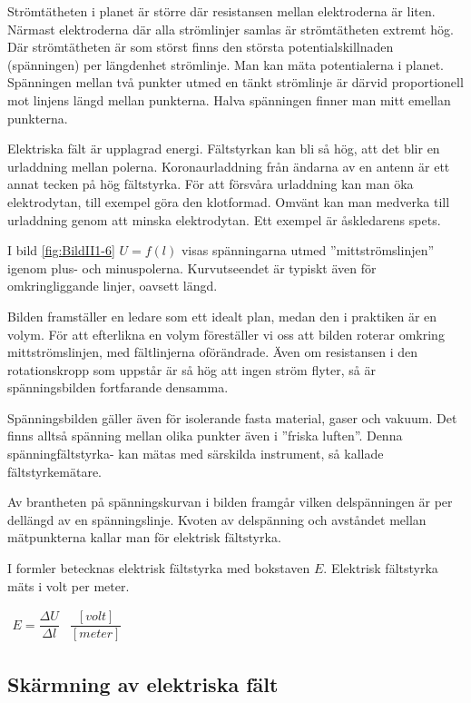 Strömtätheten i planet är större där resistansen mellan elektroderna är liten.
Närmast elektroderna där alla strömlinjer samlas är strömtätheten extremt hög.
Där strömtätheten är som störst finns den största potentialskillnaden
(spänningen) per längdenhet strömlinje.
Man kan mäta potentialerna i planet.
Spänningen mellan två punkter utmed en tänkt strömlinje är därvid proportionell
mot linjens längd mellan punkterna.
Halva spänningen finner man mitt emellan punkterna.

Elektriska fält är upplagrad energi.
Fältstyrkan kan bli så hög, att det blir en urladdning mellan polerna.
Koronaurladdning från ändarna av en antenn är ett annat tecken på hög
fältstyrka.
För att försvåra urladdning kan man öka elektrodytan, till exempel göra den klotformad.
Omvänt kan man medverka till urladdning genom att minska elektrodytan.
Ett exempel är åskledarens spets.

I bild \ref{fig:BildII1-6} \(U = f(l)\) visas spänningarna utmed
''mittströmslinjen'' igenom plus- och minuspolerna.
Kurvutseendet är typiskt även för omkringliggande linjer, oavsett längd.

Bilden framställer en ledare som ett idealt plan, medan den i praktiken är en
volym.
För att efterlikna en volym föreställer vi oss att bilden roterar omkring
mittströmslinjen, med fältlinjerna oförändrade.
Även om resistansen i den rotationskropp som uppstår är så hög att ingen ström
flyter, så är spänningsbilden fortfarande densamma.

Spänningsbilden gäller även för isolerande fasta material, gaser och vakuum.
Det finns alltså spänning mellan olika punkter även i ''friska luften''.
Denna spänningfältstyrka- kan mätas med särskilda instrument, så kallade
fältstyrkemätare.

Av brantheten på spänningskurvan i bilden framgår vilken delspänningen är per
dellängd av en spänningslinje.
Kvoten av delspänning och avståndet mellan mätpunkterna kallar man för
elektrisk fältstyrka.

I formler betecknas elektrisk fältstyrka med bokstaven \(E\).
Elektrisk fältstyrka mäts i volt per meter.

\(
\begin{array}{cc}
E=\dfrac{\Delta U}{\Delta l} & \dfrac{[volt]}{[meter]}
\end{array}
\)

\subsection{Skärmning av elektriska fält}
\label{elektrostatik skärmning}

